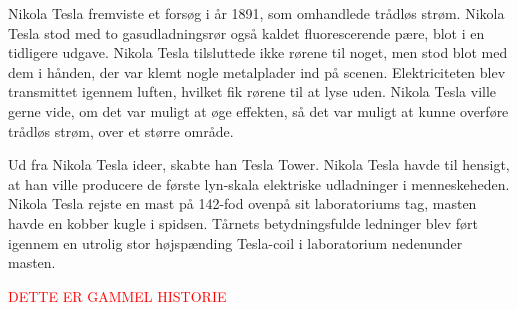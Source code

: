 Nikola Tesla fremviste et forsøg i år 1891, som omhandlede trådløs strøm. Nikola Tesla stod med to gasudladningsrør også kaldet fluorescerende pære, blot i en tidligere udgave. Nikola Tesla tilsluttede ikke rørene til noget, men stod blot med dem i hånden, der var klemt nogle metalplader ind på scenen. Elektriciteten blev transmittet igennem luften, hvilket fik rørene til at lyse uden. Nikola Tesla ville gerne vide, om det var muligt at øge effekten, så det var muligt at kunne overføre trådløs strøm, over et større område.

Ud fra Nikola Tesla ideer, skabte han Tesla Tower. Nikola Tesla havde til hensigt, at han ville producere de første lyn-skala elektriske udladninger i menneskeheden. Nikola Tesla rejste en mast på 142-fod ovenpå sit laboratoriums tag, masten havde en kobber kugle i spidsen. Tårnets betydningsfulde ledninger blev ført igennem en utrolig stor højspænding Tesla-coil i laboratorium nedenunder masten.

\textcolor{red}{DETTE ER GAMMEL HISTORIE} 

\newpage
